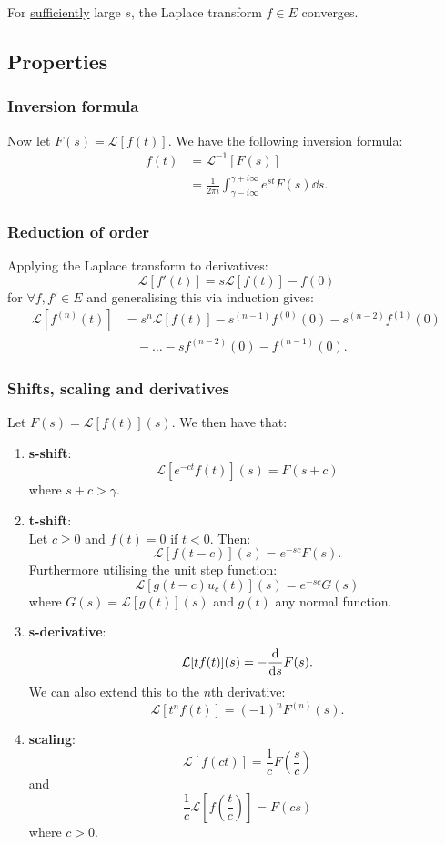 \documentclass{article}
\begin{document}
For \underline{sufficiently} large $s$, the Laplace transform
$f\in E$ converges.

\subsection{Properties}
\subsubsection{Inversion formula}
Now let $F(s)=\mathcal{L}[f(t)]$. We have
the following inversion formula:
\begin{align*}
    f(t)
    &=\mathcal{L}^{-1}[F(s)] \\
    &=\frac{1}{2\pi i}\int_{\gamma-i\infty}^
    {\gamma+i\infty}e^{st}F(s)\dd s.
\end{align*}

\subsubsection{Reduction of order}
Applying the Laplace transform to derivatives:
$$\mathcal{L}[f'(t)]=s\mathcal{L}[f(t)]-f(0)$$
for $\forall f,f'\in E$ and 
generalising this via induction gives:
\begin{align*}
    \mathcal{L}[f^{(n)}(t)]
    &=s^n\mathcal{L}[f(t)]
    -s^{(n-1)}f^{(0)}(0)-s^{(n-2)}f^{(1)}(0) \\
    &\quad-\dots-sf^{(n-2)}(0)-f^{(n-1)}(0).
\end{align*}

\subsubsection{Shifts, scaling and derivatives}
Let $F(s)=\mathcal{L}[f(t)](s)$.
We then have that:
\begin{enumerate}
    \item \textbf{s-shift}:
    $$\mathcal{L}[e^{-ct}f(t)](s)=F(s+c)$$
    where $s+c>\gamma$.
    \item \textbf{t-shift}: \\
    Let $c\geq0$ and $f(t)=0$ if $t<0$. Then:
    $$\mathcal{L}[f(t-c)](s)=e^{-sc}F(s).$$
    Furthermore utilising the unit step function:
    $$\mathcal{L}[g(t-c)u_c(t)](s)=e^{-sc}G(s)$$
    where $G(s)=\mathcal{L}[g(t)](s)$
    and $g(t)$ any normal function.

    \item \textbf{s-derivative}:
    $$\mathcal{L}[tf(t)](s)=-\dv{s}F(s).$$
    We can also extend this to the $n$th derivative:
    $$\mathcal{L}[t^n f(t)]
    =(-1)^n F^{(n)}(s).$$

    \item \textbf{scaling}:
    $$\mathcal{L}[f(ct)]=\frac{1}{c}F(\frac{s}{c})$$
    and
    $$\frac{1}{c}\mathcal{L}[f(\frac{t}{c})]=F(cs)$$
    where $c>0$.
\end{enumerate}
\end{document}

